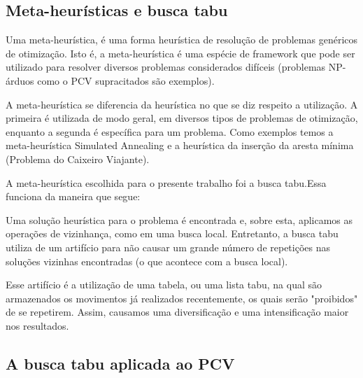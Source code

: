 \subsection{Meta-heurísticas e busca tabu}
Uma meta-heurística, é uma forma heurística de resolução de problemas genéricos de otimização\cite{metaheuristicas2009}. Isto é, a meta-heurística é uma espécie de framework que pode ser utilizado para resolver diversos problemas considerados difíceis (problemas NP-árduos como o PCV supracitados são exemplos).

A meta-heurística se diferencia da heurística no que se diz respeito a utilização. A primeira é utilizada de modo geral, em diversos tipos de problemas de otimização, enquanto a segunda é específica para um problema. Como exemplos temos a meta-heurística Simulated Annealing e a heurística da inserção da aresta mínima (Problema do Caixeiro Viajante).

A meta-heurística escolhida para o presente trabalho foi a busca tabu.Essa funciona da maneira que segue:

Uma solução heurística para o problema é encontrada e, sobre esta, aplicamos as operações de vizinhança, como em uma busca local. Entretanto, a busca tabu utiliza de um artifício para não causar um grande número de repetições nas soluções vizinhas encontradas (o que acontece com a busca local).

Esse artifício é a utilização de uma tabela, ou uma lista tabu, na qual são armazenados os movimentos já realizados recentemente, os quais serão "proibidos" de se repetirem. Assim, causamos uma diversificação e uma intensificação maior nos resultados.

\subsection{A busca tabu aplicada ao PCV}
